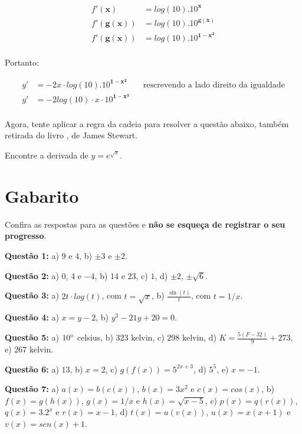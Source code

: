 \documentclass[main_estudante.tex]{subfiles}
\begin{document}
\begin{align*}
 f'(\mathbf{x}) &= log(10) . 10^\mathbf{x} \\
 f'(\mathbf{g(x)}) &= log(10) . 10^\mathbf{g(x)} \\
 f'(\mathbf{g(x)}) &= log(10) . 10^\mathbf{1-x^2} \\
\end{align*}

Portanto:

\begin{align*}
y' &= -2x \cdot log(10) . 10^\mathbf{1-x^2} && \text{rescrevendo a lado direito da igualdade} \\
y' &= -2log(10) \cdot x \cdot 10^\mathbf{1-x^2} \\
\end{align*}

Agora, tente aplicar a regra da cadeia para resolver a questão abaixo, também retirada do livro , de James Stewart.

\begin{resolva}
Encontre a derivada de $y=e^{\sqrt{x}}$.
\end{resolva}

\newpage

\section{Gabarito}

Confira as respostas para as questões e \textbf{não se esqueça de registrar o seu progresso}.

\noindent\textbf{Questão 1:} a) $9$ e $4$, b) $\pm3$ e $\pm2$.

\noindent\textbf{Questão 2:} a) $0$, $4$ e $-4$, b) $14$ e $23$, c) $1$, d) $\pm2$, $\pm\sqrt{6}$.

\noindent\textbf{Questão 3:} a) $2t \cdot log(t)$, com $t=\sqrt{x}$, b) $\frac{\sin(t)}{t}$, com $t=1/x$.

\noindent\textbf{Questão 4:} a) $x=y-2$, b) $y^3-21y+20=0$.

\noindent\textbf{Questão 5:} a) $10\degree$ celsius, b) $323$ kelvin, c) $298$ kelvin, d) $K=\frac{5(F-32)}{9}+273$, e) $267$ kelvin.

\noindent\textbf{Questão 6:} a) $13$, b) $x=2$, c) $g(f(x))=5^{2x+3}$, d) $5^5$, e) $x=-1$.

\noindent\textbf{Questão 7:} a) $a(x)=b(c(x))$, $b(x)=3x^2$ e $c(x)=cos(x)$, b) $f(x)=g(h(x))$, $g(x)=1/x$ e $h(x)=\sqrt{x-5}$, c) $p(x)=q(r(x))$, $q(x)=3.2^x$ e $r(x)=x-1$, d) $t(x)=u(v(x))$, $u(x)=x(x+1)$ e $v(x)=sen(x)+1$.
\end{document}
